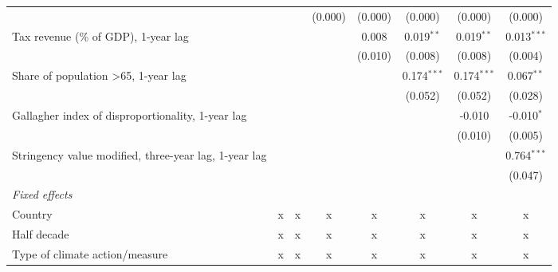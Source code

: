 \begin{tabular}{lccccccc}
                                                                   &               &               & (0.000)      & (0.000)      & (0.000)       & (0.000)       & (0.000)\\   
   Tax revenue (\% of GDP), 1-year lag                             &               &               &              & 0.008        & 0.019$^{**}$  & 0.019$^{**}$  & 0.013$^{***}$\\   
                                                                   &               &               &              & (0.010)      & (0.008)       & (0.008)       & (0.004)\\   
   Share of population >65, 1-year lag                             &               &               &              &              & 0.174$^{***}$ & 0.174$^{***}$ & 0.067$^{**}$\\   
                                                                   &               &               &              &              & (0.052)       & (0.052)       & (0.028)\\   
   Gallagher index of disproportionality, 1-year lag               &               &               &              &              &               & -0.010        & -0.010$^{*}$\\   
                                                                   &               &               &              &              &               & (0.010)       & (0.005)\\   
   Stringency value modified, three-year lag, 1-year lag           &               &               &              &              &               &               & 0.764$^{***}$\\   
                                                                   &               &               &              &              &               &               & (0.047)\\   
   \emph{Fixed effects}\\
   Country                                                         & x             & x             & x            & x            & x             & x             & x\\  
   Half decade                                                     & x             & x             & x            & x            & x             & x             & x\\  
   Type of climate action/measure                                  & x             & x             & x            & x            & x             & x             & x\\  

\end{tabular}
